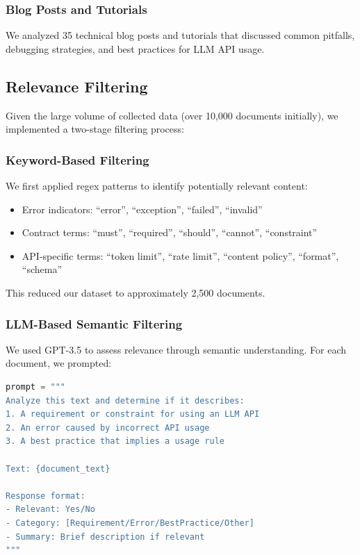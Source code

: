 \documentclass[11pt]{article}
\begin{document}
\subsubsection{Blog Posts and Tutorials}
We analyzed 35 technical blog posts and tutorials that discussed common pitfalls, debugging strategies, and best practices for LLM API usage.

\subsection{Relevance Filtering}

Given the large volume of collected data (over 10,000 documents initially), we implemented a two-stage filtering process:

\subsubsection{Keyword-Based Filtering}
We first applied regex patterns to identify potentially relevant content:
\begin{itemize}
    \item Error indicators: ``error'', ``exception'', ``failed'', ``invalid''
    \item Contract terms: ``must'', ``required'', ``should'', ``cannot'', ``constraint''
    \item API-specific terms: ``token limit'', ``rate limit'', ``content policy'', ``format'', ``schema''
\end{itemize}

This reduced our dataset to approximately 2,500 documents.

\subsubsection{LLM-Based Semantic Filtering}
We used GPT-3.5 to assess relevance through semantic understanding. For each document, we prompted:

\begin{lstlisting}[language=Python, caption={LLM Relevance Assessment Prompt}]
prompt = """
Analyze this text and determine if it describes:
1. A requirement or constraint for using an LLM API
2. An error caused by incorrect API usage
3. A best practice that implies a usage rule

Text: {document_text}

Response format:
- Relevant: Yes/No
- Category: [Requirement/Error/BestPractice/Other]
- Summary: Brief description if relevant
"""
\end{lstlisting}
\end{document}
